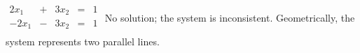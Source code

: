 {$\begin{array}{ccccc}
2x_1&+&3x_2&=&1\\
-2x_1&-&3x_2&=&1\\
\end{array}$}
{No solution; the system is inconsistent. Geometrically, the system represents two parallel lines.}